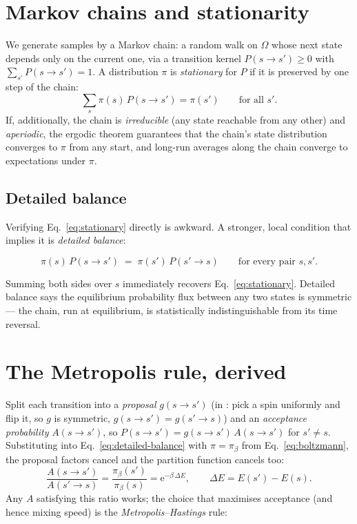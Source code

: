 \section{Markov chains and stationarity}

We generate samples by a Markov chain: a random walk on $\Omega$ whose next
state depends only on the current one, via a transition kernel
$P(s\to s')\ge0$ with $\sum_{s'}P(s\to s')=1$. A distribution $\pi$ is
\emph{stationary} for $P$ if it is preserved by one step of the chain:
\begin{equation}
\sum_{s}\pi(s)\,P(s\to s')=\pi(s')\qquad\text{for all } s'.
\label{eq:stationary}
\end{equation}
If, additionally, the chain is \emph{irreducible} (any state reachable from
any other) and \emph{aperiodic}, the ergodic theorem guarantees that the
chain's state distribution converges to $\pi$ from any start, and long-run
averages along the chain converge to expectations under $\pi$.

\subsection{Detailed balance}

Verifying Eq.~\eqref{eq:stationary} directly is awkward. A stronger, local
condition that implies it is \emph{detailed balance}:

\begin{keyeq}
\begin{equation}
\pi(s)\,P(s\to s') \;=\; \pi(s')\,P(s'\to s)
\qquad\text{for every pair } s,s' .
\label{eq:detailed-balance}
\end{equation}
\end{keyeq}

Summing both sides over $s$ immediately recovers
Eq.~\eqref{eq:stationary}. Detailed balance says the equilibrium probability
flux between any two states is symmetric --- the chain, run at equilibrium,
is statistically indistinguishable from its time reversal.

\section{The Metropolis rule, derived}
\label{sec:metropolis}

Split each transition into a \emph{proposal} $g(s\to s')$ (in \qv: pick a
spin uniformly and flip it, so $g$ is symmetric, $g(s\to s')=g(s'\to s)$) and
an \emph{acceptance probability} $A(s\to s')$, so
$P(s\to s')=g(s\to s')\,A(s\to s')$ for $s'\ne s$. Substituting into
Eq.~\eqref{eq:detailed-balance} with $\pi=\pi_\beta$ from
Eq.~\eqref{eq:boltzmann}, the proposal factors cancel and the partition
function cancels too:
\begin{equation}
\frac{A(s\to s')}{A(s'\to s)}
=\frac{\pi_\beta(s')}{\pi_\beta(s)}
=\mathrm{e}^{-\beta\,\Delta E},
\qquad \Delta E = E(s')-E(s).
\end{equation}
Any $A$ satisfying this ratio works; the choice that maximises acceptance
(and hence mixing speed) is the \emph{Metropolis--Hastings} rule:

